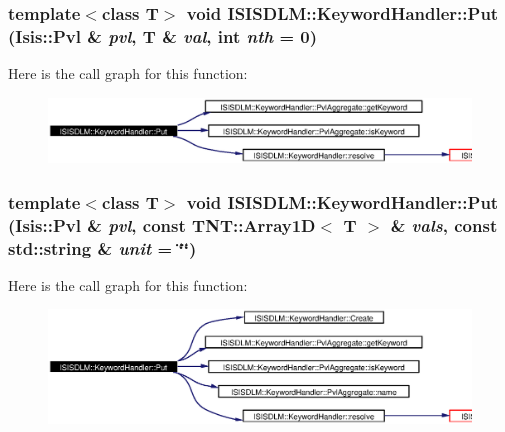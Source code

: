 \subsubsection{\setlength{\rightskip}{0pt plus 5cm}template$<$class T$>$ void ISISDLM::Keyword\-Handler::Put (Isis::Pvl \& {\em pvl}, T \& {\em val}, int {\em nth} = 0)}\label{classISISDLM_1_1KeywordHandler_a11}




Here is the call graph for this function:\begin{figure}[H]
\begin{center}
\leavevmode
\includegraphics[width=395pt]{classISISDLM_1_1KeywordHandler_a11_cgraph}
\end{center}
\end{figure}
\subsubsection{\setlength{\rightskip}{0pt plus 5cm}template$<$class T$>$ void ISISDLM::Keyword\-Handler::Put (Isis::Pvl \& {\em pvl}, const TNT::Array1D$<$ T $>$ \& {\em vals}, const std::string \& {\em unit} = \char`\"{}\char`\"{})}\label{classISISDLM_1_1KeywordHandler_a10}




Here is the call graph for this function:\begin{figure}[H]
\begin{center}
\leavevmode
\includegraphics[width=395pt]{classISISDLM_1_1KeywordHandler_a10_cgraph}
\end{center}
\end{figure}
